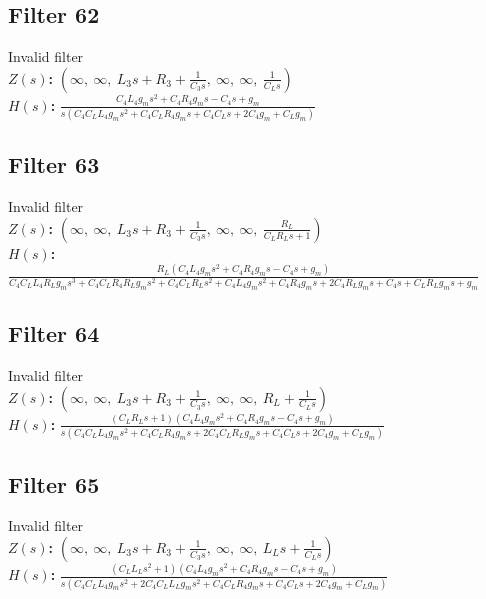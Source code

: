 \documentclass{article}
\begin{document}
\subsection*{Filter 62}
Invalid filter \\ 
\textbf{$Z(s)$:} $\left( \infty, \  \infty, \  L_{3} s + R_{3} + \frac{1}{C_{3} s}, \  \infty, \  \infty, \  \frac{1}{C_{L} s}\right)$ \\ 
\textbf{$H(s)$:} $\frac{C_{4} L_{4} g_{m} s^{2} + C_{4} R_{4} g_{m} s - C_{4} s + g_{m}}{s \left(C_{4} C_{L} L_{4} g_{m} s^{2} + C_{4} C_{L} R_{4} g_{m} s + C_{4} C_{L} s + 2 C_{4} g_{m} + C_{L} g_{m}\right)}$ \\ 
\subsection*{Filter 63}
Invalid filter \\ 
\textbf{$Z(s)$:} $\left( \infty, \  \infty, \  L_{3} s + R_{3} + \frac{1}{C_{3} s}, \  \infty, \  \infty, \  \frac{R_{L}}{C_{L} R_{L} s + 1}\right)$ \\ 
\textbf{$H(s)$:} $\frac{R_{L} \left(C_{4} L_{4} g_{m} s^{2} + C_{4} R_{4} g_{m} s - C_{4} s + g_{m}\right)}{C_{4} C_{L} L_{4} R_{L} g_{m} s^{3} + C_{4} C_{L} R_{4} R_{L} g_{m} s^{2} + C_{4} C_{L} R_{L} s^{2} + C_{4} L_{4} g_{m} s^{2} + C_{4} R_{4} g_{m} s + 2 C_{4} R_{L} g_{m} s + C_{4} s + C_{L} R_{L} g_{m} s + g_{m}}$ \\ 
\subsection*{Filter 64}
Invalid filter \\ 
\textbf{$Z(s)$:} $\left( \infty, \  \infty, \  L_{3} s + R_{3} + \frac{1}{C_{3} s}, \  \infty, \  \infty, \  R_{L} + \frac{1}{C_{L} s}\right)$ \\ 
\textbf{$H(s)$:} $\frac{\left(C_{L} R_{L} s + 1\right) \left(C_{4} L_{4} g_{m} s^{2} + C_{4} R_{4} g_{m} s - C_{4} s + g_{m}\right)}{s \left(C_{4} C_{L} L_{4} g_{m} s^{2} + C_{4} C_{L} R_{4} g_{m} s + 2 C_{4} C_{L} R_{L} g_{m} s + C_{4} C_{L} s + 2 C_{4} g_{m} + C_{L} g_{m}\right)}$ \\ 
\subsection*{Filter 65}
Invalid filter \\ 
\textbf{$Z(s)$:} $\left( \infty, \  \infty, \  L_{3} s + R_{3} + \frac{1}{C_{3} s}, \  \infty, \  \infty, \  L_{L} s + \frac{1}{C_{L} s}\right)$ \\ 
\textbf{$H(s)$:} $\frac{\left(C_{L} L_{L} s^{2} + 1\right) \left(C_{4} L_{4} g_{m} s^{2} + C_{4} R_{4} g_{m} s - C_{4} s + g_{m}\right)}{s \left(C_{4} C_{L} L_{4} g_{m} s^{2} + 2 C_{4} C_{L} L_{L} g_{m} s^{2} + C_{4} C_{L} R_{4} g_{m} s + C_{4} C_{L} s + 2 C_{4} g_{m} + C_{L} g_{m}\right)}$ \\ 
\end{document}
